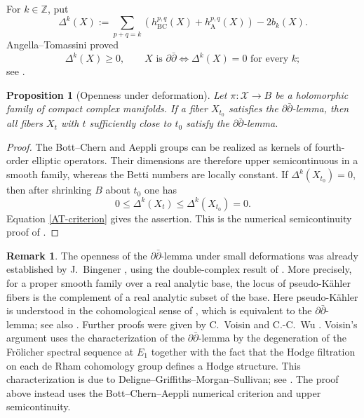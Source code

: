 \documentclass[11pt]{amsart}
\numberwithin{equation}{section}
\def\mc{\mathcal}
\def\mb{\mathbb}
\theoremstyle{plain}
\newtheorem{prop}[thm]{Proposition}
\theoremstyle{definition}
\newtheorem{rem}[thm]{Remark}
\begin{document}
For $k\in\mb Z$, put
\begin{equation*}%
 \Delta^k(X):=\sum_{p+q=k}
 \left(h_{\mathrm{BC}}^{p,q}(X)+h_{\mathrm A}^{p,q}(X)\right)-2b_k(X).
\end{equation*}
Angella--Tomassini proved
\begin{equation}\label{AT-criterion}
 \Delta^k(X)\geq0,\qquad
 X\text{ is }\partial\bar\partial
 \Longleftrightarrow
 \Delta^k(X)=0\text{ for every }k;
\end{equation}
see \cite[Theorems A and B]{AT13}.

\begin{prop}[Openness under deformation]\label{prop-openness}
Let $\pi:\mc X\to B$ be a holomorphic family of compact complex manifolds.
If a fiber $X_{t_0}$ satisfies the $\partial\bar\partial$-lemma, then all
fibers $X_t$ with $t$ sufficiently close to $t_0$ satisfy the
$\partial\bar\partial$-lemma.
\end{prop}

\begin{proof}
The Bott--Chern and Aeppli groups can be realized as kernels of fourth-order
elliptic operators.  Their dimensions are therefore upper semicontinuous in a
smooth family, whereas the Betti numbers are locally constant.  If
$\Delta^k(X_{t_0})=0$, then after shrinking $B$ about $t_0$ one has
\[
 0\leq \Delta^k(X_t)\leq \Delta^k(X_{t_0})=0.
\]
Equation \eqref{AT-criterion} gives the assertion.  This is the numerical
semicontinuity proof of \cite[Corollary 2.7]{AT13}.
\end{proof}

\begin{rem}
The openness of the $\partial\bar\partial$-lemma under small deformations
was already established by J.~Bingener \cite[Theorem~6.5]{Bin83},
using the double-complex result of \cite[Lemma~2.17]{Bin83}.
More precisely, for a proper smooth family over a real analytic base,
the locus of pseudo-K\"ahler fibers is the complement of a real analytic
subset of the base.  Here pseudo-K\"ahler is understood in the
cohomological sense of \cite[$\S$~6.4]{Bin83}, which is equivalent
to the $\partial\bar\partial$-lemma; see also
\cite[Proposition~2.9]{Bin83}.  Further proofs were given by C.~Voisin
\cite[Propositions~9.20 and~9.21]{Vi02} and C.-C.~Wu
\cite[Theorem~5.12]{Wu06}.  Voisin's argument uses the characterization of
the $\partial\bar\partial$-lemma by the degeneration of the Fr\"olicher
spectral sequence at $E_1$ together with the fact that the Hodge filtration
on each de Rham cohomology group defines a Hodge structure.  This
characterization is due to Deligne--Griffiths--Morgan--Sullivan; see
\cite[Proposition 5.17 and (5.21)]{DGMS75}.  The proof above instead uses the
Bott--Chern--Aeppli numerical criterion and upper semicontinuity.
\end{rem}
\end{document}
